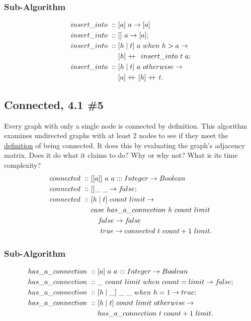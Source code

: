 \documentclass[a4paper,10pt]{book}
\newcommand\doubleplus{+\kern-1.3ex+\kern0.8ex}
\newcommand{\false}{f\kern-0.25ex{alse}}
\begin{document}
\subsubsection{Sub-Algorithm}
\begin{align*}
insert\_into\ ::\ &[a]\ a\rightarrow [a]\\
insert\_into\ ::\ &[]\ a\rightarrow [a];\\
insert\_into\ ::\ &[h\mid t]\ a\ when\ h>a\rightarrow\\
	&[h]\doubleplus\ insert\_into\ t\ a;\\
insert\_into\ ::\ &[h\mid t]\ a\ otherwise\rightarrow\\
	&[a]\doubleplus[h]\doubleplus t.
\end{align*}

\subsection{Connected, 4.1 \#5}
Every graph with only a single node is connected by definition. This algorithm examines undirected graphs with at least 2 nodes to see if they meet the  \href{https://mathworld.wolfram.com/ConnectedGraph.html}{definition} of being connected. It does this by evaluating the graph's adjacency matrix. Does it do what it claims to do? Why or why not? What is its time complexity?
\begin{align*}
connected\ ::\ &[[a]]\ a\ a:::Integer\rightarrow Boolean\\
connected\ ::\ &[]\_\ \_\rightarrow\false;\\
connected\ ::\ &[h\mid t]\ count\ limit\rightarrow\\
	&case\ has\_a\_connection\ h\ count\ limit\\
	&\quad\false\rightarrow\false\\
	&\quad\ true\rightarrow connected\ t\ count+1\ limit.
\end{align*}
\subsubsection{Sub-Algorithm}
\begin{align*}
has\_a\_connection\ ::\ &[a]\ a\ a:::Integer\rightarrow Boolean\\
has\_a\_connection\ ::\ &\_\ count\ limit\ when\ count=limit\rightarrow\false;\\
has\_a\_connection\ ::\ &[h\mid\_]\ \_\ \_\ when\ h=1\rightarrow true;\\
has\_a\_connection\ ::\ &[h\mid t]\ count\ limit\ otherwise\rightarrow\\
	&has\_a\_connection\ t\ count+1\ limit.
\end{align*}
\end{document}
